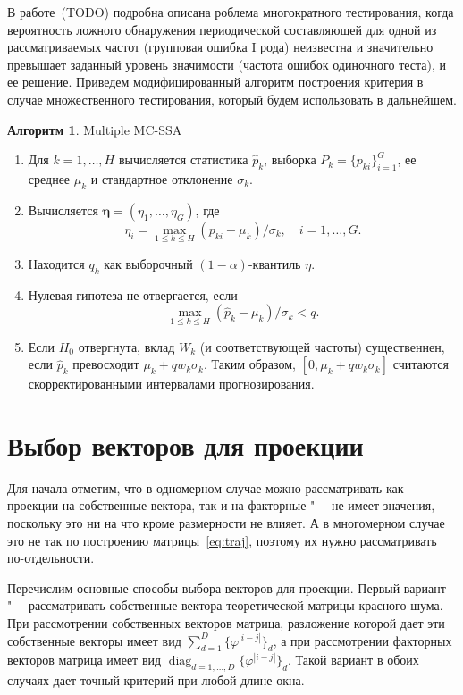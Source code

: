 \documentclass[specialist,
substylefile = spbu_report.rtx,
subf,href,colorlinks=true, 12pt]{disser}
\theoremstyle{definition}
\newtheorem{algorithm}{Алгоритм}
\begin{document}
	В работе~(TODO) подробна описана роблема многократного тестирования, когда вероятность ложного обнаружения периодической составляющей для одной из рассматриваемых частот (групповая ошибка I рода) неизвестна и значительно превышает заданный уровень значимости (частота ошибок одиночного теста), и ее решение. Приведем модифицированный алгоритм построения критерия в случае множественного тестирования, который будем использовать в дальнейшем.
	\begin{algorithm}{Multiple MC-SSA}
	\begin{enumerate}
		\item Для $k=1,\dots,H$ вычисляется статистика $\widehat{p}_k$, выборка $P_k=\{p_{ki}\}_{i=1}^G$, ее среднее $\mu_k$ и стандартное отклонение $\sigma_k$.
		\item Вычисляется $\mathbf{\eta}=(\eta_1,\dots,\eta_G)$, где
		\[
		\eta_i=\max_{1\leqslant k\leqslant H}(p_{ki}-\mu_k)/\sigma_k,\quad i=1,\dots,G.
		\]
		\item Находится $q_k$ как выборочный $(1-\alpha)$-квантиль $\eta$.
		\item Нулевая гипотеза не отвергается, если
		\[
		\max_{1\leqslant k\leqslant H}(\widehat{p}_k-\mu_k)/\sigma_k<q.
		\]
		\item Если $H_0$ отвергнута, вклад $W_k$ (и соответствующей частоты) существеннен, если $\widehat{p}_k$ превосходит $\mu_k+qw_k\sigma_k$. Таким образом, $[0,\mu_k+qw_k\sigma_k]$ считаются скорректированными интервалами прогнозирования.
	\end{enumerate}
	\end{algorithm}
	\section{Выбор векторов для проекции}
	Для начала отметим, что в одномерном случае можно рассматривать как проекции на собственные вектора, так и на факторные  "--- не имеет значения, поскольку это ни на что кроме размерности не влияет. А в многомерном случае это не так по построению матрицы~\eqref{eq:traj}, поэтому их нужно рассматривать по-отдельности.
	
	Перечислим основные способы выбора векторов для проекции. Первый вариант "--- рассматривать собственные вектора теоретической матрицы красного шума. При рассмотрении собственных векторов матрица, разложение которой дает эти собственные векторы имеет вид $\sum_{d=1}^D \{\varphi^{|i-j|}\}_d$, а при рассмотрении факторных векторов матрица имеет вид $\operatorname{diag}_{d=1,\ldots,D}\{\varphi^{|i-j|}\}_d$. Такой вариант в обоих случаях дает точный критерий при любой длине окна. 
	
\end{document}

